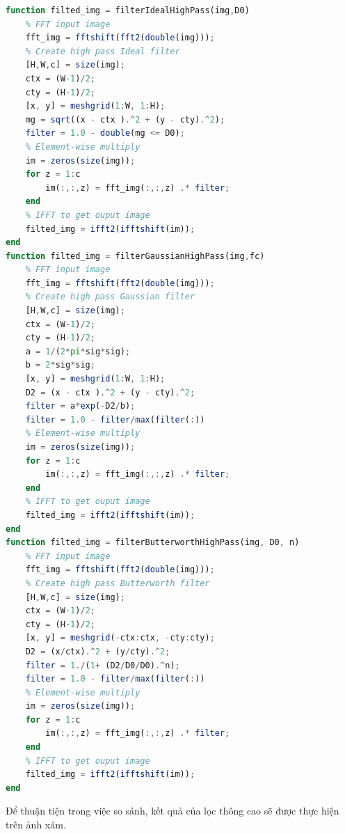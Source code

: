 \begin{lstlisting}[language=Octave]
function filted_img = filterIdealHighPass(img,D0)
    % FFT input image
    fft_img = fftshift(fft2(double(img)));
    % Create high pass Ideal filter
    [H,W,c] = size(img);
    ctx = (W-1)/2;
    cty = (H-1)/2;
    [x, y] = meshgrid(1:W, 1:H);
    mg = sqrt((x - ctx ).^2 + (y - cty).^2);
    filter = 1.0 - double(mg <= D0);
    % Element-wise multiply 
    im = zeros(size(img));
    for z = 1:c
        im(:,:,z) = fft_img(:,:,z) .* filter;
    end 
    % IFFT to get ouput image
    filted_img = ifft2(ifftshift(im));
end
function filted_img = filterGaussianHighPass(img,fc)
    % FFT input image
    fft_img = fftshift(fft2(double(img)));
    % Create high pass Gaussian filter
    [H,W,c] = size(img);
    ctx = (W-1)/2;
    cty = (H-1)/2;
    a = 1/(2*pi*sig*sig);
    b = 2*sig*sig;
    [x, y] = meshgrid(1:W, 1:H);
    D2 = (x - ctx ).^2 + (y - cty).^2;
    filter = a*exp(-D2/b);
    filter = 1.0 - filter/max(filter(:))
    % Element-wise multiply
    im = zeros(size(img));
    for z = 1:c
        im(:,:,z) = fft_img(:,:,z) .* filter;
    end 
    % IFFT to get ouput image
    filted_img = ifft2(ifftshift(im));
end
function filted_img = filterButterworthHighPass(img, D0, n)
    % FFT input image
    fft_img = fftshift(fft2(double(img)));
    % Create high pass Butterworth filter
    [H,W,c] = size(img);
    ctx = (W-1)/2;
    cty = (H-1)/2;
    [x, y] = meshgrid(-ctx:ctx, -cty:cty);
    D2 = (x/ctx).^2 + (y/cty).^2;
    filter = 1./(1+ (D2/D0/D0).^n);
    filter = 1.0 - filter/max(filter(:))
    % Element-wise multiply
    im = zeros(size(img));
    for z = 1:c
        im(:,:,z) = fft_img(:,:,z) .* filter;
    end 
    % IFFT to get ouput image
    filted_img = ifft2(ifftshift(im));
end
\end{lstlisting}
Để thuận tiện trong việc so sánh, kết quả của lọc thông cao sẽ được thực hiện trên ảnh xám. 
